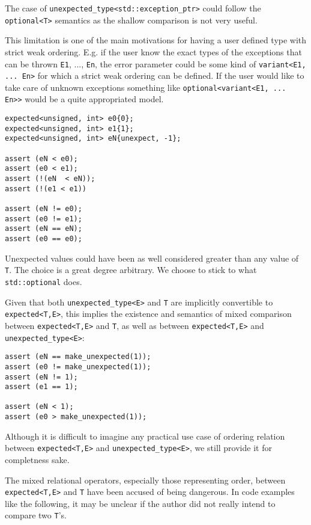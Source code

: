 \documentclass[a4paper,10pt]{article}
\newcommand{\cpp}[1]{\lstinline{#1}}
\begin{document}
The case of \cpp{unexpected_type<std::exception_ptr>} could follow the \cpp{optional<T>} semantics as the shallow comparison is not very useful.

This limitation is one of the main motivations for having a user defined type with strict weak ordering. E.g. if the user know the exact types of the exceptions that can be thrown \cpp{E1}, ..., \cpp{En}, the error parameter could be some kind of \cpp{variant<E1, ... En>} for which a strict weak ordering can be defined. If the user would like to take care of unknown exceptions something like \cpp{optional<variant<E1, ... En>>} would be a quite appropriated model. 

\begin{lstlisting}
expected<unsigned, int> e0{0};
expected<unsigned, int> e1{1};
expected<unsigned, int> eN{unexpect, -1};

assert (eN < e0);
assert (e0 < e1);
assert (!(eN  < eN));
assert (!(e1 < e1))

assert (eN != e0);
assert (e0 != e1);
assert (eN == eN);
assert (e0 == e0);
\end{lstlisting}

Unexpected values could have been as well considered greater than any value of \cpp{T}. The choice is a great degree arbitrary. We choose to stick to what \cpp{std::optional} does.

Given that both \cpp{unexpected_type<E>} and \cpp{T} are implicitly convertible to \cpp{expected<T,E>}, this implies the existence and semantics of mixed comparison between \cpp{expected<T,E>} and \cpp{T}, as well as between \cpp{expected<T,E>} and \cpp{unexpected_type<E>}:

\begin{lstlisting}
assert (eN == make_unexpected(1));
assert (e0 != make_unexpected(1));
assert (eN != 1);
assert (e1 == 1);

assert (eN < 1);
assert (e0 > make_unexpected(1));
\end{lstlisting}

Although it is difficult to imagine any practical use case of ordering relation between \cpp{expected<T,E>} and \cpp{unexpected_type<E>}, we still provide it for completness sake.

The mixed relational operators, especially those representing order, between \cpp{expected<T,E>} and \cpp{T} have been accused of being dangerous. In code examples like the following, it may be unclear if the author did not really intend to compare two \cpp{T}'s.
\end{document}
